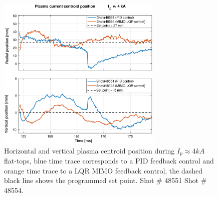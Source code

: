 \begin{figure}
	\centering
	\includegraphics[width=0.7\textwidth]{Chp5/PIDvsMIMO_551_554_2.eps}
	\caption{ Horizontal and vertical plasma centroid position during  $I_p\approx 4kA$  flat-tops, blue time trace corresponds to a PID feedback control and orange time trace to a LQR MIMO feedback control, the dashed black line shows the programmed set point. Shot $\#$ 48551 Shot $\#$ 48554. }
\end{figure}

